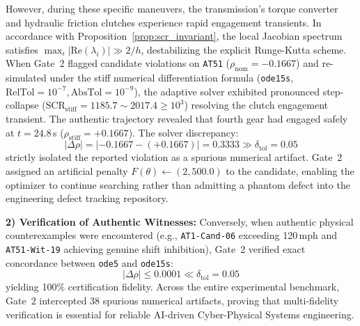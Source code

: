 \documentclass[journal]{IEEEtran}
\begin{document}
However, during these specific maneuvers, the transmission's torque converter and hydraulic friction clutches experience rapid engagement transients. In accordance with Proposition~\ref{prop:scr_invariant}, the local Jacobian spectrum satisfies $\max_i |\mathrm{Re}(\lambda_i)| \gg 2/h$, destabilizing the explicit Runge-Kutta scheme. When Gate~2 flagged candidate violations on \texttt{AT51} ($\rho_{\mathrm{nom}} = -0.1667$) and re-simulated under the stiff numerical differentiation formula (\texttt{ode15s}, $\text{RelTol} = 10^{-7}, \text{AbsTol} = 10^{-9}$), the adaptive solver exhibited pronounced step-collapse ($\text{SCR}_{\mathrm{stiff}} = 1185.7 \sim 2017.4 \ge 10^3$) resolving the clutch engagement transient. The authentic trajectory revealed that fourth gear had engaged safely at $t = 24.8$\,s ($\rho_{\mathrm{stiff}} = +0.1667$). The solver discrepancy:
\begin{equation}
|\Delta \rho| = |-0.1667 - (+0.1667)| = 0.3333 \gg \delta_{\mathrm{tol}} = 0.05
\end{equation}
strictly isolated the reported violation as a spurious numerical artifact. Gate~2 assigned an artificial penalty $F(\theta) \leftarrow (2, 500.0)$ to the candidate, enabling the optimizer to continue searching rather than admitting a phantom defect into the engineering defect tracking repository.

\noindent\textbf{2) Verification of Authentic Witnesses:}
Conversely, when authentic physical counterexamples were encountered (e.g., \texttt{AT1-Cand-06} exceeding 120\,mph and \texttt{AT51-Wit-19} achieving genuine shift inhibition), Gate~2 verified exact concordance between \texttt{ode5} and \texttt{ode15s}:
\begin{equation}
|\Delta \rho| \le 0.0001 \ll \delta_{\mathrm{tol}} = 0.05
\end{equation}
yielding 100\% certification fidelity. Across the entire experimental benchmark, Gate~2 intercepted 38 spurious numerical artifacts, proving that multi-fidelity verification is essential for reliable AI-driven Cyber-Physical Systems engineering.
\end{document}

